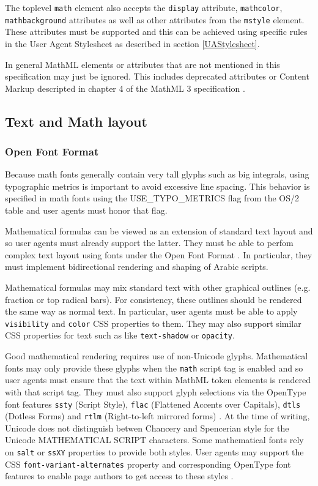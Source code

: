 The toplevel {\tt math} element also accepts the {\tt display} attribute,
{\tt mathcolor}, {\tt mathbackground} attributes as well as other attributes
from the {\tt mstyle} element. These attributes must be supported and this
can be achieved using specific rules in the User Agent Stylesheet
as described in section \ref{UAStylesheet}.

In general MathML elements or attributes that are not mentioned in this
specification may just be ignored. This includes deprecated attributes or
Content Markup descripted in chapter 4 of the MathML 3 specification
\cite{MathML3}.

\subsection{Text and Math layout}

\subsubsection{Open Font Format}

Because math fonts generally contain very tall glyphs such as big integrals,
using typographic metrics is important to avoid excessive line spacing. This
behavior is specified in math fonts using the USE\_TYPO\_METRICS flag from the
OS/2 table \cite{OpenFontFormat3} and user agents must honor that flag.

Mathematical formulas can be viewed as an extension of standard text layout
and so user agents must already support the latter. They must be able to perfom
complex text layout \cite{CTL} using fonts under the Open Font Format
\cite{OpenFontFormat3}. In particular, they must implement bidirectional
rendering and shaping of Arabic scripts.

Mathematical formulas may mix standard text with other graphical outlines
(e.g. fraction or top radical bars). For consistency, these outlines should
be rendered the same way as normal text. In particular, user agents must be
able to apply {\tt visibility} and {\tt color} CSS properties to them. They may
also support similar CSS properties for text such as like {\tt text-shadow} or
{\tt opacity}.

Good mathematical rendering requires use of non-Unicode glyphs. Mathematical
fonts may only provide these glyphs when the {\tt math}
script tag is enabled and so user agents must ensure that the text within
MathML token
elements is rendered with that script tag. They must also support glyph
selections via the OpenType font features
{\tt ssty} (Script Style), {\tt flac}
(Flattened Accents over Capitals), {\tt dtls} (Dotless Forms)
and {\tt rtlm} (Right-to-left mirrored forms) \cite{OpenFontFormat3}.
At the time of writing, Unicode does not distinguish betwen Chancery and
Spencerian style for the Unicode MATHEMATICAL SCRIPT characters. Some
mathematical fonts rely on {\tt salt} or {\tt ssXY} properties to provide
both styles. User agents may support the CSS {\tt font-variant-alternates}
property and corresponding OpenType font features to enable page authors
to get access to these styles \cite{CSS3Font} \cite{OpenFontFormat3}.

